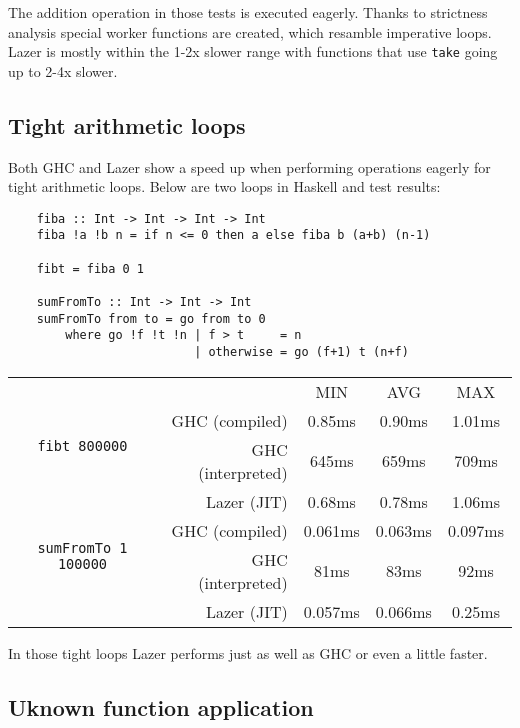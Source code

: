 \documentclass[en]{pracamgr}
\begin{document}
The addition operation in those tests is executed
eagerly. Thanks to strictness analysis special worker
functions are created, which resamble imperative loops.
Lazer is mostly within the 1-2x slower range with functions
that use \texttt{take} going up to 2-4x slower.

\subsection{Tight arithmetic loops}

Both GHC and Lazer show a speed up when performing
operations eagerly for tight arithmetic loops.
Below are two loops in Haskell and test results:

\begin{verbatim}
    fiba :: Int -> Int -> Int -> Int
    fiba !a !b n = if n <= 0 then a else fiba b (a+b) (n-1)
    
    fibt = fiba 0 1

    sumFromTo :: Int -> Int -> Int
    sumFromTo from to = go from to 0
        where go !f !t !n | f > t     = n
                          | otherwise = go (f+1) t (n+f)
\end{verbatim}

\begin{center}
\begin{tabular}{c r c c c}
    & & MIN & AVG & MAX \\
    \cline{3-5}

    \multirow{2}{*}{\texttt{fibt 800000}}
    & GHC (compiled)& 0.85ms & 0.90ms & 1.01ms \\
    & GHC (interpreted)& 645ms & 659ms & 709ms \\
    & Lazer (JIT)& 0.68ms & 0.78ms & 1.06ms \\
    \cline{2-5}

    \multirow{2}{*}{\texttt{sumFromTo 1 100000}}
    & GHC (compiled)& 0.061ms & 0.063ms & 0.097ms \\
    & GHC (interpreted)& 81ms & 83ms & 92ms \\
    & Lazer (JIT)& 0.057ms & 0.066ms & 0.25ms \\
\end{tabular}
\end{center}

In those tight loops Lazer performs just as well as GHC
or even a little faster.

\subsection{Uknown function application}\label{bench:app}
\end{document}
